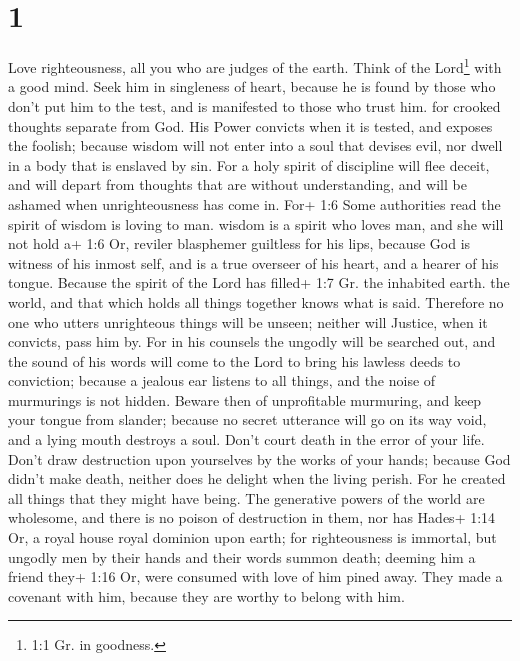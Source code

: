 \hypertarget{section}{%
\section{1}\label{section}}

 Love righteousness, all you who are judges of the earth.
Think of the Lord\footnote{1:1 Gr. in goodness.} with a good mind. Seek
him in singleness of heart,  because he is found by those
who don't put him to the test, and is manifested to those who trust him.
 for crooked thoughts separate from God. His Power convicts
when it is tested, and exposes the foolish;  because wisdom
will not enter into a soul that devises evil, nor dwell in a body that
is enslaved by sin.  For a holy spirit of discipline will
flee deceit, and will depart from thoughts that are without
understanding, and will be ashamed when unrighteousness has come in.
 For+ 1:6 Some authorities read the spirit of wisdom is
loving to man. wisdom is a spirit who loves man, and she will not hold
a+ 1:6 Or, reviler blasphemer guiltless for his lips, because God is
witness of his inmost self, and is a true overseer of his heart, and a
hearer of his tongue.  Because the spirit of the Lord has
filled+ 1:7 Gr. the inhabited earth. the world, and that which holds all
things together knows what is said.  Therefore no one who
utters unrighteous things will be unseen; neither will Justice, when it
convicts, pass him by.  For in his counsels the ungodly will
be searched out, and the sound of his words will come to the Lord to
bring his lawless deeds to conviction;  because a jealous
ear listens to all things, and the noise of murmurings is not hidden.
 Beware then of unprofitable murmuring, and keep your
tongue from slander; because no secret utterance will go on its way
void, and a lying mouth destroys a soul.  Don't court death
in the error of your life. Don't draw destruction upon yourselves by the
works of your hands;  because God didn't make death,
neither does he delight when the living perish.  For he
created all things that they might have being. The generative powers of
the world are wholesome, and there is no poison of destruction in them,
nor has Hades+ 1:14 Or, a royal house royal dominion upon earth;
 for righteousness is immortal,  but ungodly
men by their hands and their words summon death; deeming him a friend
they+ 1:16 Or, were consumed with love of him pined away. They made a
covenant with him, because they are worthy to belong with him.

